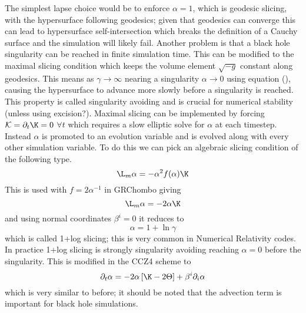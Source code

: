 The simplest lapse choice would be to enforce $\alpha=1$, which is geodesic slicing, with the hypersurface following geodesics; given that geodesics can converge this can lead to hypersurface self-intersection which breaks the definition of a Cauchy surface and the simulation will likely fail. Another problem is that a black hole singularity can be reached in finite simulation time. This can be modified to the maximal slicing condition which keeps the volume element $\sqrt{-g}$ constant along geodesics. This means as $\gamma\rightarrow\infty$ nearing a singularity $\alpha\rightarrow0$ using equation (), causing the hypersurface to advance more slowly before a singularity is reached. This property is called singularity avoiding and is crucial for numerical stability (unless using excision?). 
Maximal slicing can be implemented by forcing $\mathcal{K} = \partial_t \K = 0$ $\forall t$ which requires a slow elliptic solve for $\alpha$ at each timestep. Instead $\alpha$ is promoted to an evolution variable and is evolved along with every other simulation variable. To do this we can pick an algebraic slicing condition of the following type.
\[\L_m \alpha = -\alpha^2 f(\alpha)\K \]
This is used with $f = 2\alpha^{-1}$ in GRChombo giving
\[\L_m \alpha = -2\alpha \K \]
and using normal coordinates $\beta^i=0$ it reduces to 
\[ \alpha = 1+ \ln \gamma\]
which is called 1+log slicing; this is very common in Numerical Relativity codes. In practice 1+log slicing is strongly singularity avoiding reaching $\alpha=0$ before the singularity. This is modified in the CCZ4 scheme to 
\begin{equation}\partial_t \alpha = -2\alpha\left[ \K-2\Theta\right] + \beta^i \partial_i \alpha\end{equation}
which is very similar to before; it should be noted that the advection term is important for black hole simulations.

